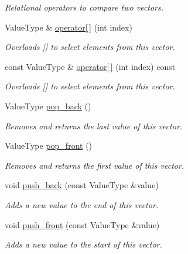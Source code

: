 \begin{DoxyCompactItemize}
\begin{DoxyCompactList}\small\item\em Relational operators to compare two vectors. \end{DoxyCompactList}\item 
Value\+Type \& \mbox{\hyperlink{classVector_a7dbb3a92c8b6a08a04b564aed136b870}{operator\mbox{[}$\,$\mbox{]}}} (int index)
\begin{DoxyCompactList}\small\item\em Overloads {\ttfamily \mbox{[}\mbox{]}} to select elements from this vector. \end{DoxyCompactList}\item 
const Value\+Type \& \mbox{\hyperlink{classVector_a1b5a4ea461655cbe512ab976aad8d809}{operator\mbox{[}$\,$\mbox{]}}} (int index) const
\begin{DoxyCompactList}\small\item\em Overloads {\ttfamily \mbox{[}\mbox{]}} to select elements from this vector. \end{DoxyCompactList}\item 
Value\+Type \mbox{\hyperlink{classVector_ab48f65e37130b674bc0f6220cbb59491}{pop\+\_\+back}} ()
\begin{DoxyCompactList}\small\item\em Removes and returns the last value of this vector. \end{DoxyCompactList}\item 
Value\+Type \mbox{\hyperlink{classVector_aacdba74afa1be07d1046ece9e0512c77}{pop\+\_\+front}} ()
\begin{DoxyCompactList}\small\item\em Removes and returns the first value of this vector. \end{DoxyCompactList}\item 
void \mbox{\hyperlink{classVector_a8ff6f18ca45e769f2f8c7a0bcf79fad9}{push\+\_\+back}} (const Value\+Type \&value)
\begin{DoxyCompactList}\small\item\em Adds a new value to the end of this vector. \end{DoxyCompactList}\item 
void \mbox{\hyperlink{classVector_a9737dc314198d1cf306325134f000c5a}{push\+\_\+front}} (const Value\+Type \&value)
\begin{DoxyCompactList}\small\item\em Adds a new value to the start of this vector. \end{DoxyCompactList}\item 

\end{DoxyCompactItemize}
